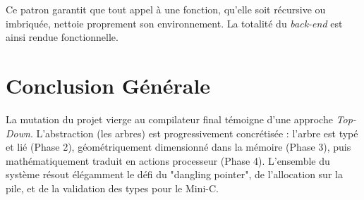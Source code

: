 \documentclass[12pt,a4paper]{article}
\begin{document}
Ce patron garantit que tout appel à une fonction, qu'elle soit récursive ou imbriquée, nettoie proprement son environnement. La totalité du \textit{back-end} est ainsi rendue fonctionnelle.

\section*{Conclusion Générale}
La mutation du projet vierge au compilateur final témoigne d'une approche \textit{Top-Down}. L'abstraction (les arbres) est progressivement concrétisée : l'arbre est typé et lié (Phase 2), géométriquement dimensionné dans la mémoire (Phase 3), puis mathématiquement traduit en actions processeur (Phase 4). L'ensemble du système résout élégamment le défi du "dangling pointer", de l'allocation sur la pile, et de la validation des types pour le Mini-C.
\end{document}
